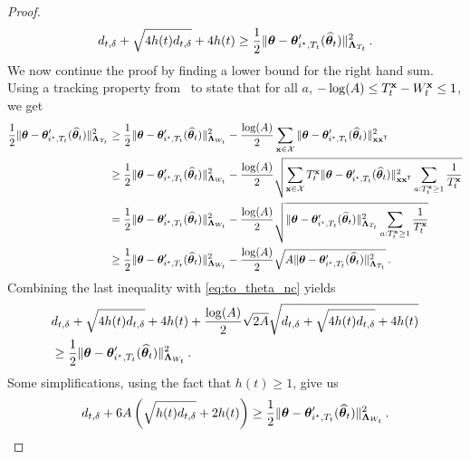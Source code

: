 \begin{proof}
\begin{equation}
\label{eq:to_theta_nc}
d_{t,\delta} + \sqrt{4 h(t) d_{t,\delta}} +4h(t) \geq \frac{1}{2} \Vert {\boldsymbol \theta} - {\boldsymbol \theta}'_{i^\star,T_t}(\widehat{{\boldsymbol \theta}}_t) \Vert_{{\boldsymbol \Lambda}_{T_t}}^2 \,.
\end{equation}
We now continue the proof by finding a lower bound for the right hand sum. Using a tracking property from~\cite{degenne2020structure} to state that for all $a$, $- \log(A) \le T_t^{{\bf x}} - W_t^{{\bf x}}\le 1$, we get
\begin{align*}
\frac{1}{2} \Vert {\boldsymbol \theta} - {\boldsymbol \theta}'_{i^\star,T_t}(\widehat{{\boldsymbol \theta}}_t) \Vert_{{\boldsymbol \Lambda}_{T_t}}^2
&\ge \frac{1}{2} \Vert {\boldsymbol \theta} - {\boldsymbol \theta}'_{i^\star,T_t}(\widehat{{\boldsymbol \theta}}_t) \Vert_{{\boldsymbol \Lambda}_{W_t}}^2
	- \frac{\log(A)}{2} \sum_{{\bf x}\in\mathcal{X}} \Vert {\boldsymbol \theta} - {\boldsymbol \theta}'_{i^\star,T_t}(\widehat{{\boldsymbol \theta}}_t) \Vert_{{\bf x}{\bf x}^\mathsf{\scriptscriptstyle T}}^2
\\
&\ge \frac{1}{2} \Vert {\boldsymbol \theta} - {\boldsymbol \theta}'_{i^\star,T_t}(\widehat{{\boldsymbol \theta}}_t) \Vert_{{\boldsymbol \Lambda}_{W_t}}^2
	- \frac{\log(A)}{2} \sqrt{\sum_{{\bf x}\in\mathcal{X}} T_t^{{\bf x}}\Vert {\boldsymbol \theta} - {\boldsymbol \theta}'_{i^\star,T_t}(\widehat{{\boldsymbol \theta}}_t) \Vert_{{\bf x}{\bf x}^\mathsf{\scriptscriptstyle T}}^2\sum_{a:T_t^{\bf x}\ge 1} \frac{1}{T_t^{\bf x}}   }
\\
&=   \frac{1}{2} \Vert {\boldsymbol \theta} - {\boldsymbol \theta}'_{i^\star,T_t}(\widehat{{\boldsymbol \theta}}_t) \Vert_{{\boldsymbol \Lambda}_{W_t}}^2
	- \frac{\log(A)}{2} \sqrt{\Vert {\boldsymbol \theta} - {\boldsymbol \theta}'_{i^\star,T_t}(\widehat{{\boldsymbol \theta}}_t) \Vert_{{\boldsymbol \Lambda}_{T_t}}^2\sum_{a:T_t^{\bf x}\ge 1} \frac{1}{T_t^{\bf x}}   }
\\
&\ge \frac{1}{2} \Vert {\boldsymbol \theta} - {\boldsymbol \theta}'_{i^\star,T_t}(\widehat{{\boldsymbol \theta}}_t) \Vert_{{\boldsymbol \Lambda}_{W_t}}^2
	-\frac{\log(A)}{2} \sqrt{ A \Vert {\boldsymbol \theta} - {\boldsymbol \theta}'_{i^\star,T_t}(\widehat{{\boldsymbol \theta}}_t) \Vert_{{\boldsymbol \Lambda}_{T_t}}^2  }\,.
\end{align*}
Combining the last inequality with \eqref{eq:to_theta_nc} yields
\begin{align*}
    &d_{t,\delta} + \sqrt{4 h(t) d_{t,\delta}} +4h(t)+\frac{\log(A)}{2} \sqrt{2 A}\sqrt{d_{t,\delta} + \sqrt{4 h(t) d_{t,\delta}} +4h(t)}\\
    &\geq \frac{1}{2} \Vert {\boldsymbol \theta} - {\boldsymbol \theta}'_{i^\star,T_t}(\widehat{{\boldsymbol \theta}}_t) \Vert_{{\boldsymbol \Lambda}_{W_t}}^2\,.
\end{align*}
Some simplifications, using the fact that $h(t)\geq 1 $, give us
\begin{equation}
  \label{eq:to_tW_nc}
  d_{t,\delta}+6A\left( \sqrt{h(t)d_{t,\delta}}+2h(t)\right)
  \geq  \frac{1}{2} \Vert \btheta - \btheta'_{\istar,T_t}(\hat{\btheta}_t) \Vert_{\bLambda_{W_t}}^2\,.

\end{equation}
\end{proof}
